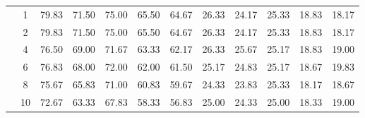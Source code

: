 \begin{table}[H]
\begin{tabular}{|c|c|c c c c c|c c c c c|}
\multicolumn{1}{|c|}{ \multirow{6}{*}{\rotatebox[origin=c]{90}{\textbf{K-vizinhos}}} }
&1	&79.83	&71.50	&75.00	&65.50	&64.67	&26.33	&24.17	&25.33	&18.83	&18.17\\\cline{2-12}
&2	&79.83	&71.50	&75.00	&65.50	&64.67	&26.33	&24.17	&25.33	&18.83	&18.17\\\cline{2-12}
&4	&76.50	&69.00	&71.67	&63.33	&62.17	&26.33	&25.67	&25.17	&18.83	&19.00\\\cline{2-12}
&6	&76.83	&68.00	&72.00	&62.00	&61.50	&25.17	&24.83	&25.17	&18.67	&19.83\\\cline{2-12}
&8	&75.67	&65.83	&71.00	&60.83	&59.67	&24.33	&23.83	&25.33	&18.17	&18.67\\\cline{2-12}
&10	&72.67	&63.33	&67.83	&58.33	&56.83	&25.00	&24.33	&25.00	&18.33	&19.00\\\midrule





	\end{tabular}
\end{table}


